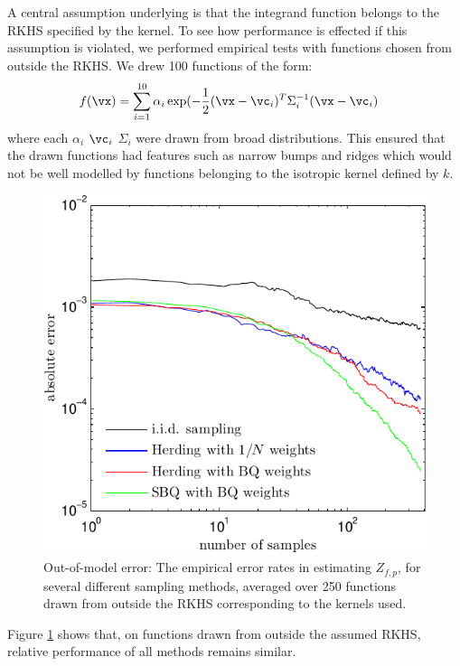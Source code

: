 A central assumption underlying \sbq{} is that the integrand function belongs to the RKHS specified by the kernel.  To see how performance is effected if this assumption is violated, we performed empirical tests with functions chosen from outside the RKHS.  We drew 100 functions of the form:
%
\begin{align}
f(\vx) & = \sum_{i=1}^{10} \alpha_i \exp(-\frac{1}{2} (\vx -\vc_i)^T \Sigma_i^{-1} (\vx -\vc_i)
\end{align}
%
where each $\alpha_i$ $\vc_i$ $\Sigma_i$ were drawn from broad distributions.  This ensured that the drawn functions had features such as narrow bumps and ridges which would not be well modelled by functions belonging to the isotropic kernel defined by $k$.
%
\begin{figure}
\includegraphics[width=\columnwidth]{figs/herding/error_curve_outmodel_400_v3}
\caption[Out-of-model error of Bayeisan quadrature, herding and random sampling]{Out-of-model error: The empirical error rates in estimating $Z_{f,p}$, for several different sampling methods, averaged over 250 functions drawn from outside the RKHS corresponding to the kernels used.}
\label{fig:error_curve_outmodel}
\end{figure}
%
Figure \ref{fig:error_curve_outmodel} shows that, on functions drawn from outside the assumed RKHS, relative performance of all methods remains similar.

